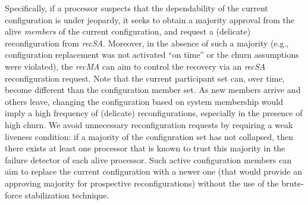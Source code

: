 \documentclass[11pt]{article}
\newcommand{\remove}[1]{}
\begin{document}
Specifically, if a processor suspects that the dependability of the current configuration is under jeopardy, it seeks to obtain a majority approval from the alive {\em members} of the current configuration, and request a (delicate) reconfiguration from \emph{recSA}. Moreover, in the absence of such a majority (e.g., configuration replacement was not activated ``on time'' or the churn assumptions were violated), the {\em recMA} can aim to control the recovery via an \emph{recSA} reconfiguration request. Note that the current participant set can, over time, become different than the configuration member set. As new members arrive and others leave, changing the configuration based on system membership would imply a high frequency of (delicate) reconfigurations, especially in the presence of high churn. We avoid unnecessary reconfiguration requests by requiring a weak liveness condition:  if a majority of the configuration set has not collapsed, then there exists at least one processor that is known to trust this majority in the failure detector of each alive processor.
Such active configuration members can aim to replace the current configuration with a newer one (that would provide an approving majority for prospective reconfigurations) without the use of the brute-force stabilization technique. \vspace{.3em}
\remove{Specifically, if a processor suspects that the dependability of the current configuration is under jeopardy, it seeks to obtain a majority approval from the alive {\em members} of the current configuration, and request a (delicate) reconfiguration from \emph{recSA}. Moreover, in the absence of such a majority (e.g., configuration replacement was not activated ``on time'' or the churn assumptions were violated), the {\em recMA} can aim to control the recovery via an \emph{recSA} reconfiguration request. Note that the current participant set can, over time, become different than the configuration member set. As new members arrive and other go, changing the configuration based on system membership would imply a high frequency of (delicate) reconfiguration, especially in the presence of high churn. Note that we avoid unnecessary reconfiguration requests by requiring a weak liveness condition: if a majority of the configuration set has not collapsed, then there exists at least one processor that is known to trust this majority in the failure detector of each alive processor.  
}
\end{document}
